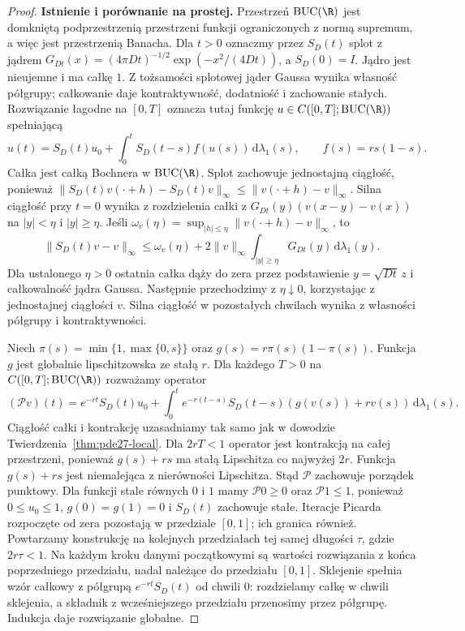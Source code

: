 \begin{proof}
\textbf{Istnienie i porównanie na prostej.}
Przestrzeń $\operatorname{BUC}(\R)$ jest domkniętą
podprzestrzenią przestrzeni funkcji ograniczonych
z normą supremum, a więc jest przestrzenią Banacha.
Dla $t>0$ oznaczmy przez $S_D(t)$ splot z jądrem
$G_{Dt}(x)=(4\pi Dt)^{-1/2}\exp(-x^2/(4Dt))$,
a $S_D(0)=I$. Jądro jest nieujemne i ma całkę $1$.
Z tożsamości splotowej jąder Gaussa wynika własność
półgrupy; całkowanie daje kontraktywność, dodatniość
i zachowanie stałych. Rozwiązanie łagodne na $[0,T]$
oznacza tutaj funkcję $u\in C([0,T];\operatorname{BUC}(\R))$
spełniającą
\[
 u(t)=S_D(t)u_0+\int_0^t S_D(t-s)f(u(s))\,
 \mathrm d\lambda_1(s),\qquad f(s)=rs(1-s).
\]
Całka jest całką Bochnera w $\operatorname{BUC}(\R)$. Splot zachowuje jednostajną
ciągłość, ponieważ
$\|S_D(t)v(\cdot+h)-S_D(t)v\|_\infty
\le\|v(\cdot+h)-v\|_\infty$.
Silna ciągłość przy $t=0$ wynika z rozdzielenia
całki z $G_{Dt}(y)(v(x-y)-v(x))$ na $|y|<\eta$
i $|y|\ge\eta$. Jeśli
$\omega_v(\eta)=\sup_{|h|\le\eta}\|v(\cdot+h)-v\|_\infty$,
to
\[
 \|S_D(t)v-v\|_\infty
 \le\omega_v(\eta)+2\|v\|_\infty
 \int_{|y|\ge\eta}G_{Dt}(y)\,\mathrm d\lambda_1(y).
\]
Dla ustalonego $\eta>0$ ostatnia całka dąży do zera
przez podstawienie $y=\sqrt{Dt}\,z$ i całkowalność
jądra Gaussa. Następnie przechodzimy z $\eta\downarrow0$,
korzystając z jednostajnej ciągłości $v$.
Silna ciągłość w pozostałych chwilach wynika
z własności półgrupy i kontraktywności.

Niech $\pi(s)=\min\{1,\max\{0,s\}\}$ oraz
$g(s)=r\pi(s)(1-\pi(s))$. Funkcja $g$ jest globalnie
lipschitzowska ze stałą $r$. Dla każdego $T>0$
na $C([0,T];\operatorname{BUC}(\R))$ rozważamy
operator
\[
 (\mathcal Pv)(t)=e^{-rt}S_D(t)u_0+
 \int_0^t e^{-r(t-s)}S_D(t-s)
       (g(v(s))+rv(s))\,\mathrm d\lambda_1(s).
\]
Ciągłość całki i kontrakcję uzasadniamy tak samo
jak w dowodzie Twierdzenia~\ref{thm:pde27-local}.
Dla $2rT<1$ operator jest kontrakcją na całej
przestrzeni, ponieważ $g(s)+rs$ ma stałą
Lipschitza co najwyżej $2r$. Funkcja $g(s)+rs$
jest niemalejąca z nierówności Lipschitza.
Stąd $\mathcal P$ zachowuje porządek punktowy.
Dla funkcji stale równych $0$ i $1$ mamy
$\mathcal P0\ge0$ oraz $\mathcal P1\le1$,
ponieważ $0\le u_0\le1$, $g(0)=g(1)=0$
i $S_D(t)$ zachowuje stałe.
Iteracje Picarda rozpoczęte od zera pozostają
w przedziale $[0,1]$; ich granica również.
Powtarzamy konstrukcję na kolejnych przedziałach
tej samej długości $\tau$, gdzie $2r\tau<1$.
Na każdym kroku danymi początkowymi są wartości
rozwiązania z końca poprzedniego przedziału, nadal
należące do przedziału $[0,1]$.
Sklejenie spełnia wzór całkowy z półgrupą
$e^{-rt}S_D(t)$ od chwili $0$: rozdzielamy całkę
w chwili sklejenia, a składnik z wcześniejszego
przedziału przenosimy przez półgrupę.
Indukcja daje rozwiązanie globalne.


\end{proof}
